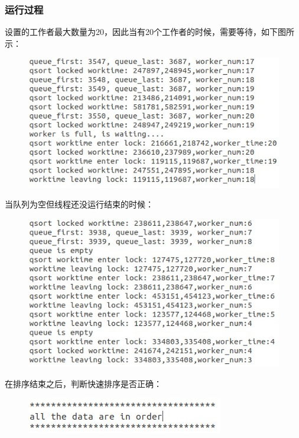 \documentclass[UTF8]{ctexart}
\begin{document}
\subsubsection{运行过程}
设置的工作者最大数量为20，因此当有20个工作者的时候，需要等待，如下图所示：\qquad \par
\begin{figure}[!h]
\centering
\includegraphics[scale = 0.7,bb=0 0 361 186]{2_workerfull.jpg}
\label{img4}
\end{figure}
当队列为空但线程还没运行结束的时候：\par
\begin{figure}[!h]
\centering
\includegraphics[scale = 0.7,bb=0 0 357 211]{2_queue_empty.jpg}
\label{img5}
\end{figure}
在排序结束之后，判断快速排序是否正确：\par
\begin{figure}[!h]
\centering
\includegraphics[scale = 0.7,bb=0 0 234 43]{2_check.jpg}
\label{img6}
\end{figure}
\end{document}
